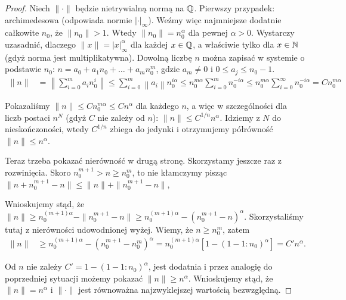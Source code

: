 \begin{proof}
	Niech $\|\cdot\|$ będzie nietrywialną normą na $\mathbb Q$.
	Pierwszy przypadek: archimedesowa (odpowiada normie $|\cdot|_\infty$).
	Weźmy więc najmniejsze dodatnie całkowite $n_0$, że $\|n_0\| > 1$.
	Wtedy $\|n_0\| = n_0^\alpha$ dla pewnej $\alpha > 0$.
	Wystarczy uzasadnić, dlaczego $\|x\| = |x|_\infty^\alpha$ dla każdej $x \in \mathbb Q$, a właściwie tylko dla $x \in \mathbb N $ (gdyż norma jest multiplikatywna).
	Dowolną liczbę $n$ można zapisać w systemie o podstawie $n_0$: $n = a_0 + a_1 n_0 + \dots + a_mn_0^m$, gdzie $a_m \neq 0$ i $0 \le a_j \le n_0-1$.
	\begin{align*}
		\|n\| & = \left\|\sum_{i=0}^m a_in_0^i\right\| \le \sum_{i=0}^m \left\|a_i\right\| n_0^{i \alpha} \le n_0^{m \alpha} \sum_{i = 0}^m n_0^{-i \alpha} \le n_0^{m \alpha} \sum_{i = 0}^\infty n_0^{-i \alpha} = C n_0^{m \alpha} %
	\end{align*}

	Pokazaliśmy $\|n\| \le Cn_0^{m \alpha} \le C n^\alpha$ dla każdego $n$, a więc w szczególności dla liczb postaci $n^N$ (gdyż $C$ nie zależy od $n$): $\|n\| \le C^{1/n}n^\alpha$.
	Idziemy z $N$ do nieskończoności, wtedy $C^{1/n}$ zbiega do jedynki i otrzymujemy półrówność $\|n\| \le n^\alpha$.

	Teraz trzeba pokazać nierówność w drugą stronę.
	Skorzystamy jeszcze raz z rozwinięcia.
	Skoro $n_0^{m+1} > n \ge n_0^m$, to nie kłamczymy pisząc $\|n+n_0^{m+1} - n\| \le \|n\| + \|n_0^{m+1} - n\|$, 
	
	Wnioskujemy stąd, że $\|n\| \ge n_0^{(m+1) \alpha} - \|n_0^{m+1} - n\| \ge n_0^{(m+1)\alpha} - (n_0^{m+1} - n)^\alpha$.
	Skorzystaliśmy tutaj z nierówności udowodnionej wyżej.
	Wiemy, że $n \ge n_0^m$, zatem
	\begin{align*}
		\|n\| & \ge n_0^{(m+1)\alpha} - (n_0^{m+1} - n_0^m)^\alpha = n_0^{(m+1) \alpha} [1 - (1 - 1 : n_0)^\alpha] = C' n^\alpha.
	\end{align*}

	Od $n$ nie zależy $C' = 1 - (1-1:n_0)^\alpha$, jest dodatnia i przez analogię do poprzedniej sytuacji możemy pokazać $\|n\| \ge n^\alpha$.
	Wnioskujemy stąd, że $\|n\| = n^\alpha$ i $\|\cdot\|$ jest równoważna najzwyklejszej wartością bezwzględną.


\end{proof}
